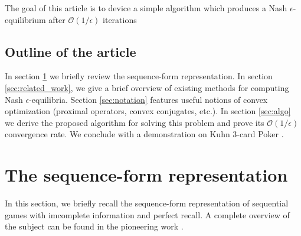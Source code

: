 \documentclass{article} %
\begin{document}
The goal of this article is to device a simple algorithm which produces a Nash $\epsilon$-equilibrium after $\mathcal{O}(1/\epsilon)$ iterations%

\subsection{Outline of the article}
In section \ref{sec:rep} we briefly review the sequence-form representation. In section \ref{sec:related_work}, we give a brief overview of existing methods for computing Nash $\epsilon$-equilibria. Section \ref{sec:notation} features useful notions of convex optimization (proximal operators, convex conjugates, etc.). In section \ref{sec:algo} we derive the proposed algorithm for solving this problem and prove its $\mathcal{O}(1/\epsilon)$ convergence rate. We conclude with a demonstration on Kuhn 3-card Poker \cite{kuhn}.



\section{The sequence-form representation}
\label{sec:rep}
In this section, we briefly recall the sequence-form representation of sequential games with imcomplete information and perfect recall. A complete overview of the subject can be found in the pioneering work \cite{von1996efficient}.
\end{document}
